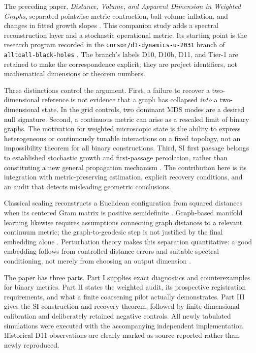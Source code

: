 \documentclass[11pt,letterpaper]{article}
\theoremstyle{definition}
\theoremstyle{remark}
\begin{document}
The preceding paper, \emph{Distance, Volume, and Apparent Dimension in Weighted Graphs}, separated pointwise metric contraction, ball-volume inflation, and changes in fitted growth slopes \cite{leblond2026a}. This companion study adds a spectral reconstruction layer and a stochastic operational metric. Its starting point is the research program recorded in the \texttt{cursor/d1-dynamics-u-2031} branch of \texttt{alltoall-black-holes} \cite{leblondBranch}. The branch's labels D10, D10b, D11, and Tier-1 are retained to make the correspondence explicit; they are project identifiers, not mathematical dimensions or theorem numbers.

Three distinctions control the argument. First, a failure to recover a two-dimensional reference is not evidence that a graph has collapsed \emph{into} a two-dimensional state. In the grid controls, two dominant MDS modes are a desired null signature. Second, a continuous metric can arise as a rescaled limit of binary graphs. The motivation for weighted microscopic state is the ability to express heterogeneous or continuously tunable interactions on a fixed topology, not an impossibility theorem for all binary constructions. Third, SI first passage belongs to established stochastic growth and first-passage percolation, rather than constituting a new general propagation mechanism \cite{richardson1973,vandenberg1993}. The contribution here is its integration with metric-preserving estimation, explicit recovery conditions, and an audit that detects misleading geometric conclusions.

Classical scaling reconstructs a Euclidean configuration from squared distances when its centered Gram matrix is positive semidefinite \cite{schoenberg1935}. Graph-based manifold learning likewise requires assumptions connecting graph distances to a relevant continuum metric; the graph-to-geodesic step is not justified by the final embedding alone \cite{tenenbaum2000}. Perturbation theory makes this separation quantitative: a good embedding follows from controlled distance errors and suitable spectral conditioning, not merely from choosing an output dimension \cite{arias2020}.

The paper has three parts. Part I supplies exact diagnostics and counterexamples for binary metrics. Part II states the weighted audit, its prospective registration requirements, and what a finite coarsening pilot actually demonstrates. Part III gives the SI construction and recovery theorem, followed by finite-dimensional calibration and deliberately retained negative controls. All newly tabulated simulations were executed with the accompanying independent implementation. Historical D11 observations are clearly marked as source-reported rather than newly reproduced.
\end{document}

